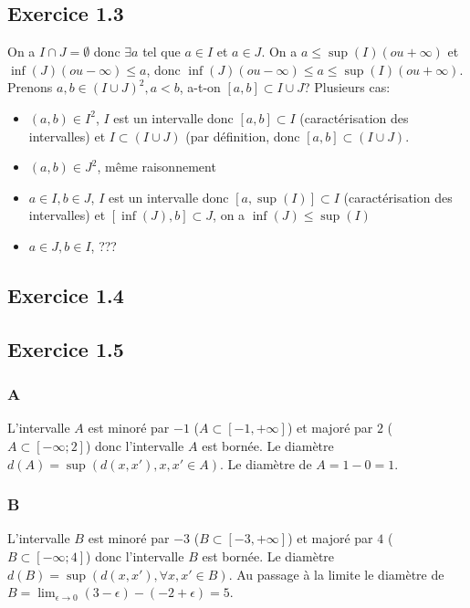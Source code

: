\documentclass[]{book}
\theoremstyle{definition}
\begin{document}
\subsection*{Exercice 1.3}

On a $I \cap J = \emptyset$ donc $\exists a$ tel que $a \in I$ et $a \in J$. On a $a \leq \sup(I) (ou +\infty)$ et $\inf(J) (ou -\infty) \leq a$, donc $\inf(J) (ou -\infty) \leq a \leq \sup(I) (ou +\infty)$.\\

Prenons $a,b \in (I \cup J)^2, a < b$, a-t-on $[a,b] \subset I \cup J$? 
Plusieurs cas:
\begin{itemize}
\item $(a,b) \in I^2$, $I$ est un intervalle donc $[a,b] \subset I$ (caract\'erisation des intervalles) et $I \subset (I \cup J)$ (par d\'efinition, donc $[a,b] \subset (I \cup J)$.
\item $(a,b) \in J^2$, m\^eme raisonnement 
\item $a \in I, b \in J$, $I$ est un intervalle donc $[a,\sup(I)] \subset I$ (caract\'erisation des intervalles) et $[\inf(J),b] \subset J$, on a $\inf(J) \leq \sup(I)$ 
\item $a \in J, b \in I$, ???
\end{itemize}



\subsection*{Exercice 1.4}


\subsection*{Exercice 1.5}
\subsubsection*{A}
L'intervalle $A$ est minor\'e par $-1$ ($A \subset [-1,+\infty]$) et major\'e par $2$ ($A \subset [-\infty; 2]$) donc l'intervalle $A$ est born\'ee. Le diam\`etre $d(A) = \sup(d(x,x'),x,x' \in A)$. Le diam\`etre de $A = 1-0 = 1$.

\subsubsection*{B}
L'intervalle $B$ est minor\'e par $-3$ ($B \subset [-3,+\infty]$) et major\'e par $4$ ($B \subset [-\infty; 4]$) donc l'intervalle $B$ est born\'ee. Le diam\`etre $d(B) = \sup(d(x,x'), \forall x,x' \in B)$. Au passage \`a la limite le diam\`etre de $B = \lim_{\epsilon \to 0} (3-\epsilon)-(-2+\epsilon) = 5$.
\end{document}
